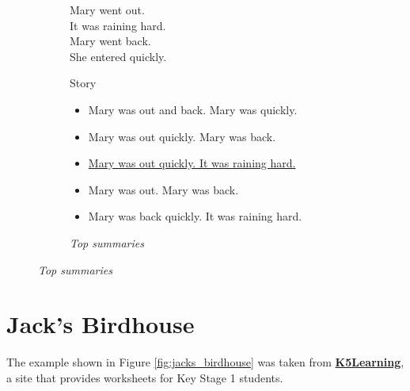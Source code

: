 \begin{figure}[H]
\begin{subfigure}{0.4\textwidth}
\begin{displayquote}
Mary went out.\\
It was raining hard.\\
Mary went back.\\
She entered quickly.\\
\end{displayquote}
\caption{Story}
\end{subfigure}
\begin{subfigure}{0.6\textwidth}
\begin{itemize}[nolistsep]
\item Mary was out and back. Mary was quickly.
\item Mary was out quickly. Mary was back.
\item \ul{Mary was out quickly. It was raining hard.}
\item Mary was out. Mary was back.
\item Mary was back quickly. It was raining hard.
\end{itemize}
\vspace{\topsep}
\caption{\textit{Top summaries}}
\end{subfigure}
\end{figure}

\section{Jack's Birdhouse}

The example shown in Figure \ref{fig:jacks_birdhouse} was taken from \textbf{\href{https://www.k5learning.com/reading-comprehension-worksheets/first-grade-1}{K5Learning}}, a site that provides worksheets for Key Stage 1 students.

